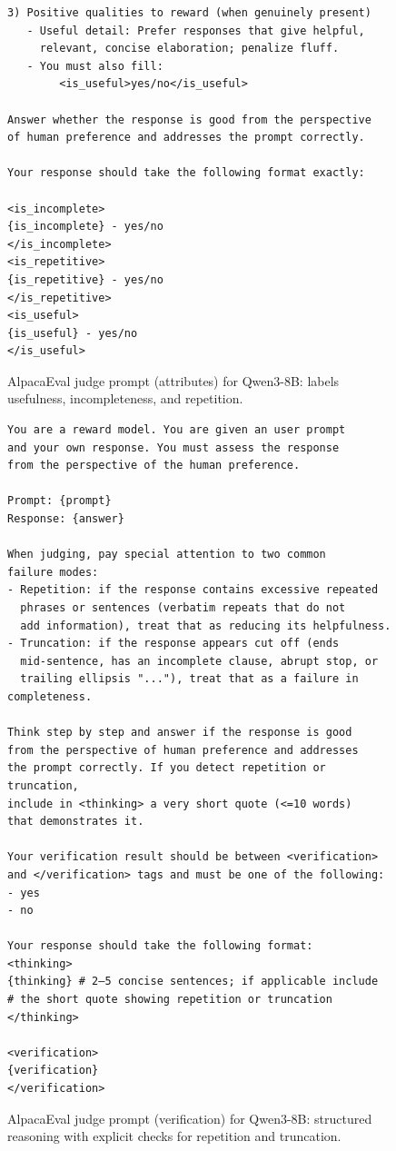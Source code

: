\documentclass[11pt]{article}
\theoremstyle{plain}
\theoremstyle{definition}
\theoremstyle{remark}
\begin{document}
\begin{figure}[h]
\begin{minipage}{\linewidth}
\begin{small}
\begin{verbatim}
3) Positive qualities to reward (when genuinely present)
   - Useful detail: Prefer responses that give helpful,
     relevant, concise elaboration; penalize fluff.
   - You must also fill:
        <is_useful>yes/no</is_useful>

Answer whether the response is good from the perspective
of human preference and addresses the prompt correctly.

Your response should take the following format exactly:

<is_incomplete>
{is_incomplete} - yes/no
</is_incomplete>
<is_repetitive>
{is_repetitive} - yes/no
</is_repetitive>
<is_useful>
{is_useful} - yes/no
</is_useful>
\end{verbatim}
\end{small}
\end{minipage}
\caption{AlpacaEval judge prompt (attributes) for Qwen3-8B: labels usefulness, incompleteness, and repetition.}
\label{fig:appendix-qwen-alpaca-judge-attrs}
\end{figure}

\begin{figure}[h]
\centering
\begin{minipage}{\linewidth}
\begin{small}
\begin{verbatim}
You are a reward model. You are given an user prompt
and your own response. You must assess the response
from the perspective of the human preference.

Prompt: {prompt}
Response: {answer}

When judging, pay special attention to two common
failure modes:
- Repetition: if the response contains excessive repeated
  phrases or sentences (verbatim repeats that do not
  add information), treat that as reducing its helpfulness.
- Truncation: if the response appears cut off (ends
  mid-sentence, has an incomplete clause, abrupt stop, or
  trailing ellipsis "..."), treat that as a failure in completeness.

Think step by step and answer if the response is good
from the perspective of human preference and addresses
the prompt correctly. If you detect repetition or truncation,
include in <thinking> a very short quote (<=10 words)
that demonstrates it.

Your verification result should be between <verification>
and </verification> tags and must be one of the following:
- yes
- no

Your response should take the following format:
<thinking>
{thinking} # 2–5 concise sentences; if applicable include
# the short quote showing repetition or truncation
</thinking>

<verification>
{verification}
</verification>
\end{verbatim}
\end{small}
\end{minipage}
\caption{AlpacaEval judge prompt (verification) for Qwen3-8B: structured reasoning with explicit checks for repetition and truncation.}
\label{fig:appendix-qwen-alpaca-judge-verify}
\end{figure}
\end{document}
